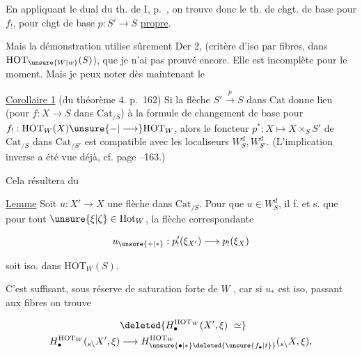 En appliquant le dual du th. de I, p.~, on trouve donc le th. de chgt. de base pour $f_!$, pour chgt de base $p:S'\longrightarrow S$ \uline{propre}.



Mais la démonstration utilise sûrement Der 2,  (critère d'iso par fibres, dans $\mathrm{HOT}_{\unsure{W|w}}(S)$), que je n'ai pas prouvé encore. Elle est incomplète pour le moment. Mais je peux noter dès maintenant le

\uline{Corollaire 1} (du théorème 4. p.~162) Si la flèche $S'\xrightarrow{p}S$ dans $\mathrm{Cat}$ donne lieu (pour  $f:X\longrightarrow S$  dans $\mathrm{Cat}_{/S}$) à la formule de changement de base pour $f_!:\mathrm{HOT}_W(X)\unsure{\mathord{-}|\longrightarrow}\mathrm{HOT}_W$, alors le foncteur $p^*:X\longmapsto X\times_S S'$ de $\mathrm{Cat}_{/S}$ dans $\mathrm{Cat}_{/S'}$  est compatible avec les localiseurs $W_S^d,W_{S'}^d$. (L'implication inverse a été vue déjà, cf. page --163.)

Cela résultera du

\uline{Lemme} Soit $u:X'\longrightarrow X$ une flèche dans $\mathrm{Cat}_{/S}$. Pour que $u\in W_S^d$, il f. et s.  que pour tout $\unsure{\xi|\zeta}\in\mathrm{Hot}_W$, la flèche correspondante


\[
 u_{\unsure{+|*}}:p'_!(\xi_{X'})\longrightarrow p_!(\xi_X)
\]

soit iso. dans $\mathrm{HOT}_W(S)$.

C'est suffisant, sous réserve de saturation forte de $W$ \deleted{\unsure{$/$}}, car si $u_*$ est iso, passant aux fibres on trouve 

\[
\begin{aligned}
 &\deleted{H_{\bullet}^{\mathrm{HOT}_W}(X',\xi)\ \simeq}\\
 H_{\bullet}^{\mathrm{HOT}_W}({}_{s\backslash}X',\xi)&\longrightarrow
 H_{\unsure{\bullet|*}\deleted{\unsure{f_{\bullet}|t}}}^{\mathrm{HOT}_W}({}_{s\backslash}X,\xi),
\end{aligned}
\]

